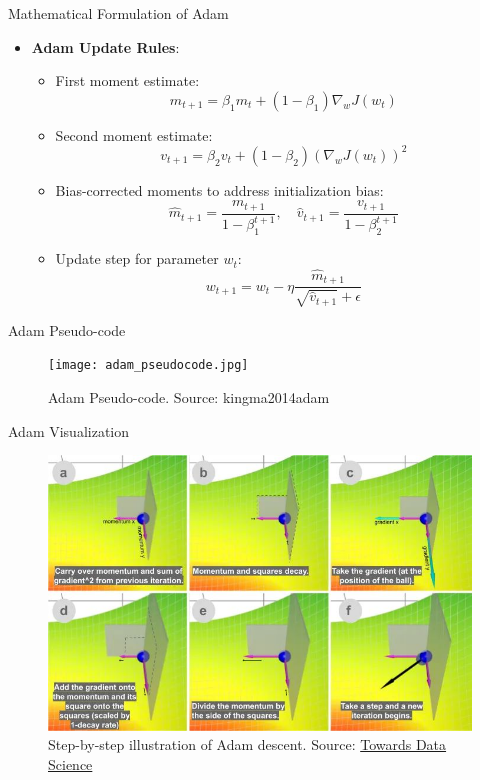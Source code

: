 \documentclass[serif, aspectratio=169]{beamer}
\begin{document}
\begin{frame}{Mathematical Formulation of Adam}
    \begin{itemize}
        \item \textbf{Adam Update Rules}:
        \begin{itemize}
            \item First moment estimate:
            \[
            m_{t+1} = \beta_1 m_t + (1 - \beta_1) \nabla_w J(w_t)
            \]
            \item Second moment estimate:
            \[
            v_{t+1} = \beta_2 v_t + (1 - \beta_2) (\nabla_w J(w_t))^2
            \]
            \item Bias-corrected moments to address initialization bias:
            \[
            \hat{m}_{t+1} = \frac{m_{t+1}}{1 - \beta_1^{t+1}}, \quad 
            \hat{v}_{t+1} = \frac{v_{t+1}}{1 - \beta_2^{t+1}}
            \]
            \item Update step for parameter \( w_t \):
            \[
            w_{t+1} = w_t - \eta \frac{\hat{m}_{t+1}}{\sqrt{\hat{v}_{t+1}} + \epsilon}
            \]
        \end{itemize}
    \end{itemize}
\end{frame}

\begin{frame}{Adam Pseudo-code}
    \begin{figure}
        \centering
        \texttt{[image: adam\_pseudocode.jpg]}
        \caption{\footnotesize Adam Pseudo-code. Source: kingma2014adam}

    \end{figure}
\end{frame}

\begin{frame}{Adam Visualization}
\begin{figure}
    \centering
    \includegraphics[width=0.65\linewidth]{pic/adam_towardsdatascience.jpg}
    \caption{\footnotesize Step-by-step illustration of Adam descent. Source: \href{https://towardsdatascience.com/a-visual-explanation-of-gradient-descent-methods-momentum-adagrad-rmsprop-adam-f898b102325c}{Towards Data Science}}
\end{figure}

\end{frame}
\end{document}
